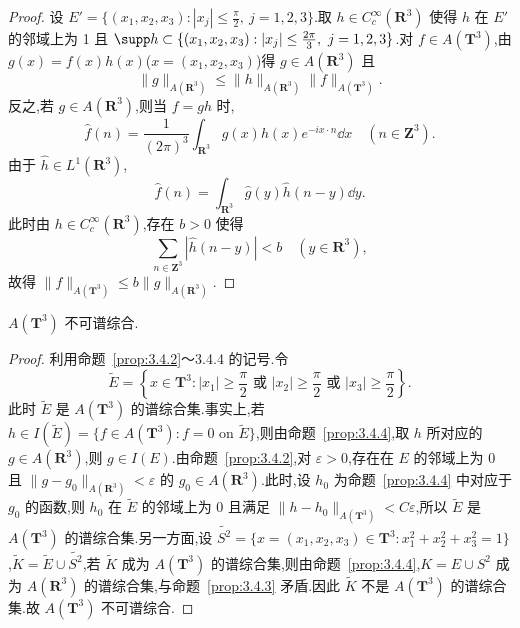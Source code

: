 \begin{proof}
设 $E' = \{(x_{1}, x_{2}, x_{3}): |x_{j}| \leq \frac{\pi}{2},\ j = 1, 2, 3\}$.取 $h \in C_{c}^{\infty}(\mathbf{R}^{3})$ 使得 $h$ 在 $E'$ 的邻域上为 1 且 $\supp h \subset \{(x_{1}, x_{2}, x_{3}): |x_{j}| \leq \frac{2\pi}{3},\ j = 1, 2, 3\}$.对 $f \in A(\mathbf{T}^{3})$,由 $g(x) = f(x)h(x)$($x = (x_{1}, x_{2}, x_{3})$)得 $g \in A(\mathbf{R}^{3})$ 且
\begin{equation*}
\|g\|_{A(\mathbf{R}^{3})} \leq \|h\|_{A(\mathbf{R}^{3})}\|f\|_{A(\mathbf{T}^{3})}.
\end{equation*}
反之,若 $g \in A(\mathbf{R}^{3})$,则当 $f = gh$ 时,
\begin{equation*}
\widehat{f}(n) = \frac{1}{(2\pi)^{3}}\int_{\mathbf{R}^{3}}g(x)h(x)e^{-ix \cdot n}\dd x \quad (n \in \mathbf{Z}^{3}).
\end{equation*}
由于 $\widehat{h} \in L^{1}(\mathbf{R}^{3})$,
\begin{equation*}
\widehat{f}(n) = \int_{\mathbf{R}^{3}}\widehat{g}(y)\widehat{h}(n - y)\dd y.
\end{equation*}
此时由 $h \in C_{c}^{\infty}(\mathbf{R}^{3})$,存在 $b > 0$ 使得
\begin{equation*}
\sum_{n \in \mathbf{Z}^{3}}|\widehat{h}(n - y)| < b \quad (y \in \mathbf{R}^{3}),
\end{equation*}
故得 $\|f\|_{A(\mathbf{T}^{3})} \leq b\|g\|_{A(\mathbf{R}^{3})}$.
\end{proof}

\begin{theorem}\label{thm:3.4.5}
$A(\mathbf{T}^{3})$ 不可谱综合.
\end{theorem}

\begin{proof}
利用命题~\ref{prop:3.4.2}～3.4.4 的记号.令
\begin{equation*}
\widetilde{E} = \left\{x \in \mathbf{T}^{3}: |x_{1}| \geq \frac{\pi}{2} \text{ 或 } |x_{2}| \geq \frac{\pi}{2} \text{ 或 } |x_{3}| \geq \frac{\pi}{2}\right\}.
\end{equation*}
此时 $\widetilde{E}$ 是 $A(\mathbf{T}^{3})$ 的谱综合集.事实上,若 $h \in I(\widetilde{E}) = \{f \in A(\mathbf{T}^{3}): f = 0 \text{ on } \widetilde{E}\}$,则由命题~\ref{prop:3.4.4},取 $h$ 所对应的 $g \in A(\mathbf{R}^{3})$,则 $g \in I(E)$.由命题~\ref{prop:3.4.2},对 $\varepsilon > 0$,存在在 $E$ 的邻域上为 0 且 $\|g - g_{0}\|_{A(\mathbf{R}^{3})} < \varepsilon$ 的 $g_{0} \in A(\mathbf{R}^{3})$.此时,设 $h_{0}$ 为命题~\ref{prop:3.4.4} 中对应于 $g_{0}$ 的函数,则 $h_{0}$ 在 $\widetilde{E}$ 的邻域上为 0 且满足 $\|h - h_{0}\|_{A(\mathbf{T}^{3})} < C\varepsilon$,所以 $\widetilde{E}$ 是 $A(\mathbf{T}^{3})$ 的谱综合集.另一方面,设 $\widetilde{S^{2}} = \{x = (x_{1}, x_{2}, x_{3}) \in \mathbf{T}^{3}: x_{1}^{2} + x_{2}^{2} + x_{3}^{2} = 1\}$,$\widetilde{K} = \widetilde{E} \cup \widetilde{S^{2}}$,若 $\widetilde{K}$ 成为 $A(\mathbf{T}^{3})$ 的谱综合集,则由命题~\ref{prop:3.4.4},$K = E \cup S^{2}$ 成为 $A(\mathbf{R}^{3})$ 的谱综合集,与命题~\ref{prop:3.4.3} 矛盾.因此 $\widetilde{K}$ 不是 $A(\mathbf{T}^{3})$ 的谱综合集.故 $A(\mathbf{T}^{3})$ 不可谱综合.
\end{proof}

